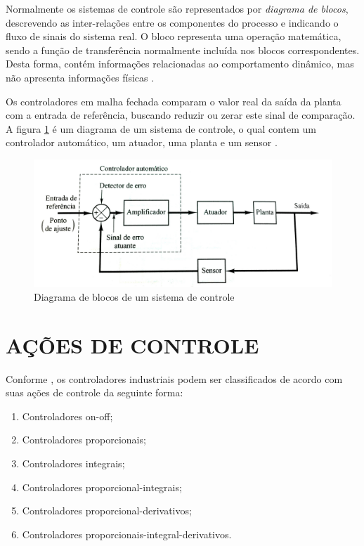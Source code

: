\documentclass[12pt,oneside,a4paper, chapter=TITLE, section = TITLE, english, brazil]{abntex2}
\begin{document}
Normalmente os sistemas de controle são representados por \textit{diagrama de blocos}, descrevendo as inter-relações entre os componentes do processo e indicando o fluxo de sinais do sistema real. O bloco representa uma operação matemática, sendo a função de transferência normalmente incluída nos blocos correspondentes. Desta forma, contém informações relacionadas ao comportamento dinâmico, mas não apresenta informações físicas \cite{ogata}.

Os controladores em malha fechada comparam o valor real da saída da planta com a entrada de referência, buscando reduzir ou zerar este sinal de comparação. A figura \ref{fig:cont_autom} é um diagrama de um sistema de controle, o qual contem um controlador automático, um atuador, uma planta e um sensor \cite{ogata}.

\begin{figure}[h] %
\centering
\includegraphics[scale=0.24]{./imagens/cont_autom}
\caption[Diagrama de blocos de um sistema de controle]{Diagrama de blocos de um sistema de controle \cite{ogata}}
\label{fig:cont_autom}
\end{figure}


\section{AÇÕES DE CONTROLE} %

Conforme , os controladores industriais podem ser classificados de acordo com suas ações de controle da seguinte forma:

\begin{enumerate}

\item Controladores on-off;

\item Controladores proporcionais;

\item Controladores integrais;

\item Controladores proporcional-integrais;

\item Controladores proporcional-derivativos;

\item Controladores proporcionais-integral-derivativos.

\end{enumerate}
\end{document}
